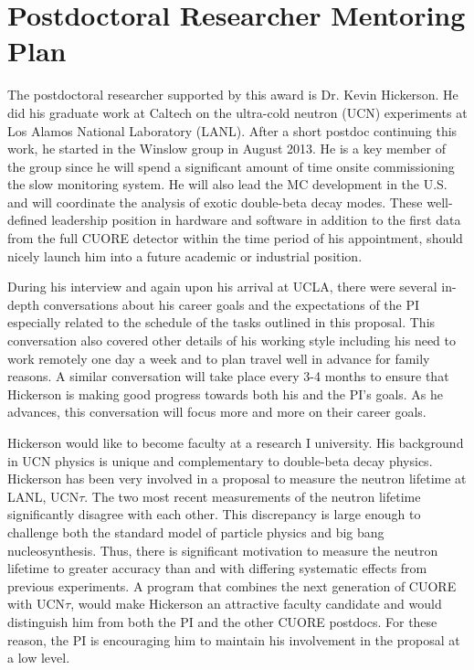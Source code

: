 \section{Postdoctoral Researcher Mentoring Plan}
The postdoctoral researcher supported by this award is Dr. Kevin Hickerson. He did his graduate work at Caltech on the ultra-cold neutron (UCN) experiments at Los Alamos National Laboratory (LANL). After a short postdoc continuing this work, he started in the Winslow group in August 2013. He is a key member of the group since he will spend a significant amount of time onsite commissioning the slow monitoring system. He will also lead the MC development in the U.S. and will coordinate the analysis of exotic double-beta decay modes. These well-defined leadership position in hardware and software in addition to the first data from the full CUORE detector within the time period of his appointment, should nicely launch him into a future academic or industrial position.

During his interview and again upon his arrival at UCLA, there were several in-depth conversations about his career goals and the expectations of the PI especially related to the schedule of the tasks outlined in this proposal.  This conversation also covered other details of his working style including his need to work remotely one day a week and to plan travel well in advance for family reasons. A similar conversation will take place every 3-4 months to ensure that Hickerson is making good progress towards both his and the PI's goals. As he advances, this conversation will focus more and more on their career goals.

Hickerson would like to become faculty at a research I university. His background in UCN physics is unique and complementary to double-beta decay physics. Hickerson has been very involved in a proposal to measure the neutron lifetime at LANL, UCN$\tau$.  The two most recent measurements of the neutron lifetime significantly disagree with each other. This discrepancy is large enough to challenge both the standard model of particle physics and big bang nucleosynthesis. Thus, there is significant motivation to measure the neutron lifetime to greater accuracy than and with differing systematic effects from previous experiments. A program that combines the next generation of CUORE with UCN$\tau$, would make Hickerson an attractive faculty candidate and would distinguish him from both the PI and the other CUORE postdocs. For these reason, the PI is encouraging him to maintain his involvement in the proposal at a low level. 

